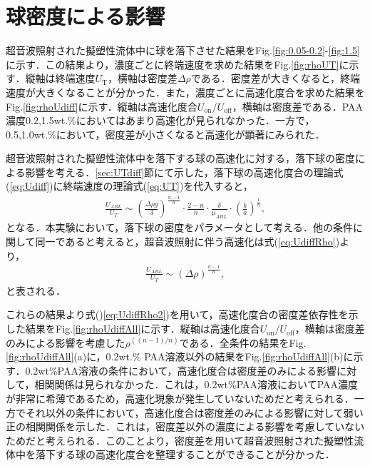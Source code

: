 \section{球密度による影響}

超音波照射された擬塑性流体中に球を落下させた結果をFig.\ref{fig:0.05-0.2}-\ref{fig:1.5}に示す．この結果より，濃度ごとに終端速度を求めた結果をFig.\ref{fig:rhoUT}に示す．縦軸は終端速度$U_\text{T}$，横軸は密度差$\Delta\rho$である．密度差が大きくなると，終端速度が大きくなることが分かった．また，濃度ごとに高速化度合を求めた結果をFig.\ref{fig:rhoUdiff}に示す．縦軸は高速化度合$U_\text{on}/U_\text{off}$，横軸は密度差である．PAA濃度0.2,1.5wt.\%においてはあまり高速化が見られなかった．一方で，0.5,1.0wt.\%において，密度差が小さくなると高速化が顕著にみられた．

超音波照射された擬塑性流体中を落下する球の高速化に対する，落下球の密度による影響を考える．\ref{sec:UTdiff}節にて示した，落下球の高速化度合の理論式(\ref{eq:Udiff})に終端速度の理論式(\ref{eq:UT})を代入すると，
\begin{eqnarray}
    \frac{U_{ABL}}{U_T} \sim \left(\frac{\Delta\rho{}g}{3}\right)^{\frac{n-1}{n}}\cdot\frac{2-n}{n}\cdot\frac{\delta}{\mu_{ABL}}\cdot\left(\frac{k}{a}\right)^{\frac{1}{n}} ,
    \label{eq:UdiffRho}
\end{eqnarray}
となる．本実験において，落下球の密度をパラメータとして考える．他の条件に関して同一であると考えると，超音波照射に伴う高速化は式(\ref{eq:UdiffRho})より，
\begin{eqnarray}
    \frac{U_{ABL}}{U_T} \sim \left(\Delta\rho{}\right)^{\frac{n-1}{n}} ,
    \label{eq:UdiffRho2}
\end{eqnarray}
と表される．

これらの結果より式()\ref{eq:UdiffRho2})を用いて，高速化度合の密度差依存性を示した結果をFig.\ref{fig:rhoUdiffAll}に示す．縦軸は高速化度合$U_\text{on}/U_\text{off}$，横軸は密度差のみによる影響を考慮した$\rho^{\left(\left(n-1\right)/n\right)}$である．全条件の結果をFig.\ref{fig:rhoUdiffAll}(a)に，0.2wt.\% PAA溶液以外の結果をFig.\ref{fig:rhoUdiffAll}(b)に示す．0.2wt\%PAA溶液の条件において，高速化度合は密度差のみによる影響に対して，相関関係は見られなかった．これは，0.2wt\%PAA溶液においてPAA濃度が非常に希薄であるため，高速化現象が発生していないためだと考えられる．一方でそれ以外の条件において，高速化度合は密度差のみによる影響に対して弱い正の相関関係を示した．これは，密度差以外の濃度による影響を考慮していないためだと考えられる．このことより，密度差を用いて超音波照射された擬塑性流体中を落下する球の高速化度合を整理することができることが分かった．


